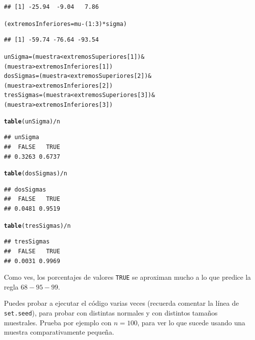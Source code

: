 \documentclass[10pt,a4paper]{article}\usepackage[]{graphicx}\usepackage[]{color}
\makeatletter
\newcommand{\hlnum}[1]{\textcolor[rgb]{0.686,0.059,0.569}{#1}}%
\newcommand{\hlopt}[1]{\textcolor[rgb]{0,0,0}{#1}}%
\newcommand{\hlstd}[1]{\textcolor[rgb]{0.345,0.345,0.345}{#1}}%
\newcommand{\hlkwb}[1]{\textcolor[rgb]{0.69,0.353,0.396}{#1}}%
\newcommand{\hlkwd}[1]{\textcolor[rgb]{0.737,0.353,0.396}{\textbf{#1}}}%
\newenvironment{kframe}{%
 \def\at@end@of@kframe{}%
 \ifinner\ifhmode%
  \def\at@end@of@kframe{\end{minipage}}%
  \begin{minipage}{\columnwidth}%
 \fi\fi%
 \def\FrameCommand##1{\hskip\@totalleftmargin \hskip-\fboxsep
 \colorbox{shadecolor}{##1}\hskip-\fboxsep
     \hskip-\linewidth \hskip-\@totalleftmargin \hskip\columnwidth}%
 \MakeFramed {\advance\hsize-\width
   \@totalleftmargin\z@ \linewidth\hsize
   \@setminipage}}%
 {\par\unskip\endMakeFramed%
 \at@end@of@kframe}
\newenvironment{knitrout}{}{} %
\makeatother
\begin{document}
\begin{enumerate}
\begin{knitrout}
\begin{kframe}
\begin{verbatim}
## [1] -25.94  -9.04   7.86
\end{verbatim}
\begin{alltt}
\hlstd{(extremosInferiores} \hlkwb{=} \hlstd{mu} \hlopt{-} \hlstd{(}\hlnum{1}\hlopt{:}\hlnum{3}\hlstd{)} \hlopt{*} \hlstd{sigma)}
\end{alltt}
\begin{verbatim}
## [1] -59.74 -76.64 -93.54
\end{verbatim}
\begin{alltt}
\hlstd{unSigma} \hlkwb{=} \hlstd{(muestra} \hlopt{<} \hlstd{extremosSuperiores[}\hlnum{1}\hlstd{])} \hlopt{&}  \hlstd{(muestra} \hlopt{>} \hlstd{extremosInferiores[}\hlnum{1}\hlstd{])}
\hlstd{dosSigmas} \hlkwb{=} \hlstd{(muestra} \hlopt{<} \hlstd{extremosSuperiores[}\hlnum{2}\hlstd{])} \hlopt{&}  \hlstd{(muestra} \hlopt{>} \hlstd{extremosInferiores[}\hlnum{2}\hlstd{])}
\hlstd{tresSigmas} \hlkwb{=} \hlstd{(muestra} \hlopt{<} \hlstd{extremosSuperiores[}\hlnum{3}\hlstd{])} \hlopt{&}  \hlstd{(muestra} \hlopt{>} \hlstd{extremosInferiores[}\hlnum{3}\hlstd{])}

\hlkwd{table}\hlstd{(unSigma)} \hlopt{/} \hlstd{n}
\end{alltt}
\begin{verbatim}
## unSigma
##  FALSE   TRUE 
## 0.3263 0.6737
\end{verbatim}
\begin{alltt}
\hlkwd{table}\hlstd{(dosSigmas)} \hlopt{/} \hlstd{n}
\end{alltt}
\begin{verbatim}
## dosSigmas
##  FALSE   TRUE 
## 0.0481 0.9519
\end{verbatim}
\begin{alltt}
\hlkwd{table}\hlstd{(tresSigmas)} \hlopt{/} \hlstd{n}
\end{alltt}
\begin{verbatim}
## tresSigmas
##  FALSE   TRUE 
## 0.0031 0.9969
\end{verbatim}
\end{kframe}
\end{knitrout}
    Como ves, los porcentajes de valores {\tt TRUE} se aproximan mucho a lo que predice la regla $68-95-99$.

    Puedes probar a ejecutar el código varias veces (recuerda comentar la línea de {\tt set.seed}), para probar con distintas normales y con distintos tamaños muestrales. Prueba por ejemplo con $n=100$, para ver lo que sucede usando una muestra comparativamente pequeña.


\end{enumerate}
\end{document}
